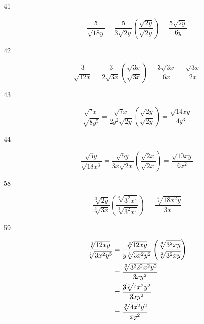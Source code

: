 \documentclass[fleqn,addpoints]{exam}
\begin{document}
\begin{description}
\item[41]
\[
  \frac{5}{\sqrt{18y}} = \frac{5}{3\sqrt{2y}} \left( \frac{\sqrt{2y}}{\sqrt{2y}} \right) = \frac{5\sqrt{2y}}{6y}
\]

\item[42]
\[
  \frac{3}{\sqrt{12x}} = \frac{3}{2\sqrt{3x}} \left( \frac{\sqrt{3x}}{\sqrt{3x}} \right) = \frac{3\sqrt{3x}}{6x} = \frac{\sqrt{3x}}{2x}
\]

\item[43]
\[
  \frac{\sqrt{7x}}{\sqrt{8y^5}} = \frac{\sqrt{7x}}{2y^2\sqrt{2y}} \left( \frac{\sqrt{2y}}{\sqrt{2y}} \right) 
  = \frac{\sqrt{14xy}}{4y^3}
\]

\item[44]
\[
  \frac{\sqrt{5y}}{\sqrt{18x^3}} = \frac{\sqrt{5y}}{3x\sqrt{2x}} \left( \frac{\sqrt{2x}}{\sqrt{2x}} \right) 
  = \frac{\sqrt{10xy}}{6x^2}
\]




\item[58]
\[
  \frac{\sqrt[3]{2y}}{\sqrt[3]{3x}} \left( \frac{\sqrt[3]{3^2x^2}}{\sqrt[3]{3^2x^2}} \right) 
  = \frac{\sqrt[3]{18x^2y}}{3x}
\]

\item[59]
\begin{align*}
  \frac{\sqrt[3]{12xy}}{\sqrt[3]{3x^2y^5}} &= \frac{\sqrt[3]{12xy}}{y\sqrt[3]{3x^2y^2}}
     \left(\frac{\sqrt[3]{3^2xy}}{\sqrt[3]{3^2xy}} \right) \\
  &= \frac{\sqrt[3]{3^32^2x^2y^2}}{3xy^2} \\
  &= \frac{\cancel{3} \sqrt[3]{4x^2y^2}}{\cancel{3}xy^2} \\
  &= \frac{\sqrt[3]{4x^2y^2}}{xy^2}
\end{align*}


\end{description}
\end{document}
